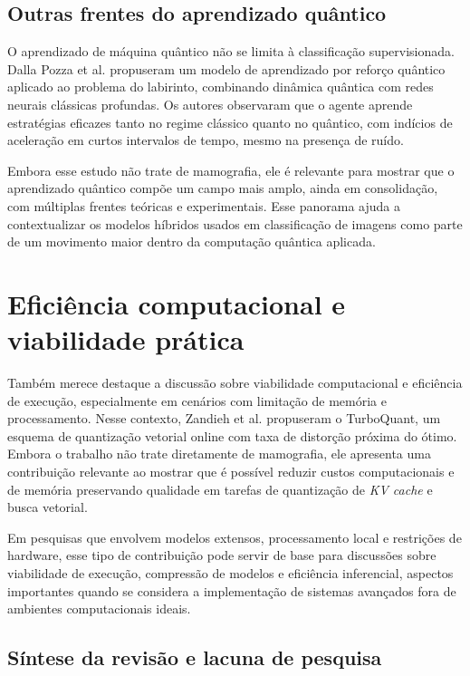 \documentclass[
    12pt,
    openright,
    oneside,
    a4paper,
    english,
    brazil
]{abntex2}
\begin{document}
\subsection{Outras frentes do aprendizado quântico}

O aprendizado de máquina quântico não se limita à classificação supervisionada. Dalla Pozza et al. \cite{dallapozza2022} propuseram um modelo de aprendizado por reforço quântico aplicado ao problema do labirinto, combinando dinâmica quântica com redes neurais clássicas profundas. Os autores observaram que o agente aprende estratégias eficazes tanto no regime clássico quanto no quântico, com indícios de aceleração em curtos intervalos de tempo, mesmo na presença de ruído.

Embora esse estudo não trate de mamografia, ele é relevante para mostrar que o aprendizado quântico compõe um campo mais amplo, ainda em consolidação, com múltiplas frentes teóricas e experimentais. Esse panorama ajuda a contextualizar os modelos híbridos usados em classificação de imagens como parte de um movimento maior dentro da computação quântica aplicada.

\section{Eficiência computacional e viabilidade prática}

Também merece destaque a discussão sobre viabilidade computacional e eficiência de execução, especialmente em cenários com limitação de memória e processamento. Nesse contexto, Zandieh et al. \cite{zandieh2025} propuseram o TurboQuant, um esquema de quantização vetorial online com taxa de distorção próxima do ótimo. Embora o trabalho não trate diretamente de mamografia, ele apresenta uma contribuição relevante ao mostrar que é possível reduzir custos computacionais e de memória preservando qualidade em tarefas de quantização de \textit{KV cache} e busca vetorial.

Em pesquisas que envolvem modelos extensos, processamento local e restrições de hardware, esse tipo de contribuição pode servir de base para discussões sobre viabilidade de execução, compressão de modelos e eficiência inferencial, aspectos importantes quando se considera a implementação de sistemas avançados fora de ambientes computacionais ideais.

\subsection{Síntese da revisão e lacuna de pesquisa}
\end{document}
